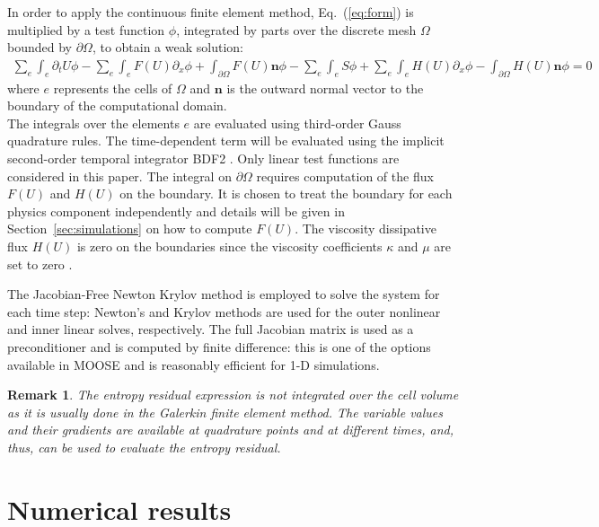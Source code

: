 \documentclass[review]{elsarticle}
\newtheorem{remark}{Remark}[section]
\newcommand{\eqt}[1]{Eq.~(\ref{#1})}                     %
\newcommand{\sect}[1]{Section~\ref{#1}}                     %
\begin{document}
In order to apply the continuous finite element method, \eqt{eq:form} is multiplied by a test function $\phi$, integrated by parts over the discrete mesh $\Omega$ bounded by $\partial \Omega$, to obtain a weak solution:
\begin{multline}
\sum_e \int_{e} \partial_t U \phi - \sum_e \int_{e} F(U) \partial_x \phi + \int_{\partial \Omega} F(U) \mathbf{n} \phi - 
 \sum_e \int_{e} S \phi + \sum_e \int_{e} H(U) \partial_x \phi - \int_{\partial \Omega}H \left( U \right) \mathbf{n} \phi= 0
\end{multline}
where $e$ represents the cells of $\Omega$ and $\mathbf{n}$ is the outward normal vector to the boundary of the computational domain. \\
The integrals over the elements $e$ are evaluated using third-order Gauss quadrature rules. The time-dependent term will be evaluated using the implicit second-order temporal integrator BDF2 \cite{Leveque}. Only linear test functions are considered in this paper.
The integral on $\partial \Omega$ requires computation of the flux $F(U)$ and $H(U)$ on the boundary. It is chosen to treat the boundary for each physics component independently and details will be given in \sect{sec:simulations} on how to compute $F(U)$. The viscosity dissipative flux $H(U)$ is zero on the boundaries since the viscosity coefficients $\kappa$ and $\mu$ are set to zero \cite{jlg1, jlg2, valentin}. 

The Jacobian-Free Newton Krylov method \cite{JFNK} is employed to solve the system for each time step: Newton's and Krylov methods are used for the outer nonlinear and inner linear solves, respectively. The full Jacobian matrix is used as a preconditioner and is computed by finite difference: this is one of the options available in MOOSE and is reasonably efficient for 1-D simulations. 

\begin{remark}
The entropy residual expression is not integrated over the cell volume as it is usually done in the Galerkin finite element method. The variable values and their gradients are available at quadrature points and at different times, and, thus, can be used to evaluate the entropy residual. 
\end{remark}

\section{Numerical results}
\label{sec:num-res}
\end{document}
